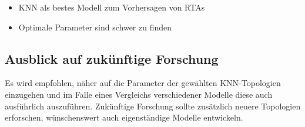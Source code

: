 \documentclass{scrartcl}
\begin{document}
\begin{itemize}
   \item{KNN als bestes Modell zum Vorhersagen von RTAs}
   \item{Optimale Parameter sind schwer zu finden}
\end{itemize}

\subsection{Ausblick auf zukünftige Forschung}

Es wird empfohlen, näher auf die Parameter der gewählten KNN-Topologien
einzugehen und im Falle eines Vergleichs verschiedener Modelle diese auch
ausführlich auszuführen. Zukünftige Forschung sollte zusätzlich neuere
Topologien erforschen, wünschenswert auch eigenständige Modelle entwickeln.

\printbibliography
\listoffigures
\listoftables
\end{document}
